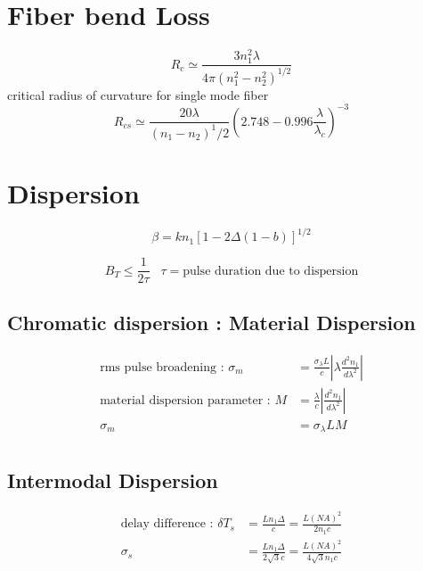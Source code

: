 \documentclass[12pt, onecolumn]{article}
\begin{document}
\section{Fiber bend Loss}
    \begin{equation}
        R_c \simeq \displaystyle\frac{3n_1^2\lambda}{4\pi(n_1^2-n_2^2)^{1/2}}
        \label{eq:crit_radius}
    \end{equation}
    critical radius of curvature for single mode fiber
    \begin{equation}
        R_{cs} \simeq \displaystyle\frac{20\lambda}{(n_1 - n_2)^1/2} \left( 2.748 - 0.996 \displaystyle\frac{\lambda}{\lambda_c} \right)^{-3}
        \label{eq:crit_single_radius}
    \end{equation}

\section{Dispersion}
    \begin{equation}
        \beta = kn_1 [1-2\Delta(1-b)]^{1/2}
        \label{eq:beta}
    \end{equation}

    \begin{equation}
        B_T \leq \frac{1}{2\tau} \;\;\; \tau = \text{pulse duration due to dispersion}
        \label{eq:opt_bit_rate}
    \end{equation}
    
    \subsection{Chromatic dispersion : Material Dispersion}
        \begin{equation}
            \begin{aligned}
                \text{rms pulse broadening : }\sigma_m &= \displaystyle\frac{\sigma_\lambda L}{c} 
                        \left| \lambda \displaystyle\frac{d^2 n_1}{d\lambda^2} \right| \\
                \text{material dispersion parameter : }M &= \frac{\lambda}{c} \left| \displaystyle\frac{d^2 n_1}{d\lambda^2} \right| \\
                \sigma_m &= \sigma_\lambda L M \\
            \end{aligned}
            \label{eq:mat_dispersion}
        \end{equation}

    \subsection{Intermodal Dispersion}
        \begin{equation}
            \begin{aligned}
                \text{delay difference : } \delta T_s &= \frac{Ln_1\Delta}{c} = \frac{L(NA)^2}{2 n_1 c} \\
                \sigma_s &= \frac{L n_1 \Delta}{2 \sqrt 3 c} = \frac{L(NA)^2}{4\sqrt 3 n_1 c} \\
            \end{aligned} 
            \label{eq:intermodal_dispersion}
        \end{equation}
\end{document}
